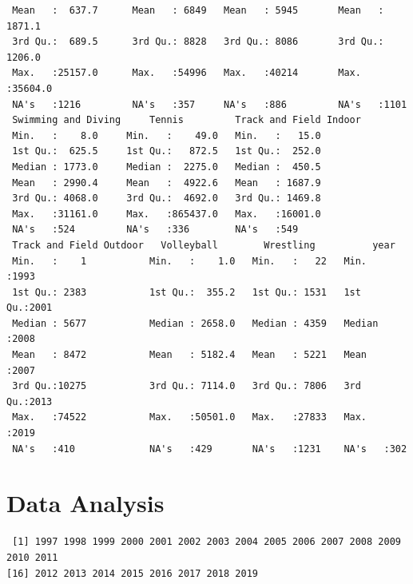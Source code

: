 \documentclass[
  letterpaper,
  DIV=11,
  numbers=noendperiod]{scrartcl}
\newenvironment{Shaded}{\begin{snugshade}}{\end{snugshade}}
\newcommand{\FunctionTok}[1]{\textcolor[rgb]{0.28,0.35,0.67}{#1}}
\newcommand{\NormalTok}[1]{\textcolor[rgb]{0.00,0.23,0.31}{#1}}
\newcommand{\SpecialCharTok}[1]{\textcolor[rgb]{0.37,0.37,0.37}{#1}}
\begin{document}
\begin{verbatim}
 Mean   :  637.7      Mean   : 6849   Mean   : 5945       Mean   : 1871.1    
 3rd Qu.:  689.5      3rd Qu.: 8828   3rd Qu.: 8086       3rd Qu.: 1206.0    
 Max.   :25157.0      Max.   :54996   Max.   :40214       Max.   :35604.0    
 NA's   :1216         NA's   :357     NA's   :886         NA's   :1101       
 Swimming and Diving     Tennis         Track and Field Indoor
 Min.   :    8.0     Min.   :    49.0   Min.   :   15.0       
 1st Qu.:  625.5     1st Qu.:   872.5   1st Qu.:  252.0       
 Median : 1773.0     Median :  2275.0   Median :  450.5       
 Mean   : 2990.4     Mean   :  4922.6   Mean   : 1687.9       
 3rd Qu.: 4068.0     3rd Qu.:  4692.0   3rd Qu.: 1469.8       
 Max.   :31161.0     Max.   :865437.0   Max.   :16001.0       
 NA's   :524         NA's   :336        NA's   :549           
 Track and Field Outdoor   Volleyball        Wrestling          year     
 Min.   :    1           Min.   :    1.0   Min.   :   22   Min.   :1993  
 1st Qu.: 2383           1st Qu.:  355.2   1st Qu.: 1531   1st Qu.:2001  
 Median : 5677           Median : 2658.0   Median : 4359   Median :2008  
 Mean   : 8472           Mean   : 5182.4   Mean   : 5221   Mean   :2007  
 3rd Qu.:10275           3rd Qu.: 7114.0   3rd Qu.: 7806   3rd Qu.:2013  
 Max.   :74522           Max.   :50501.0   Max.   :27833   Max.   :2019  
 NA's   :410             NA's   :429       NA's   :1231    NA's   :302   
\end{verbatim}

\section{Data Analysis}\label{data-analysis}

\begin{Shaded}
\end{Shaded}

\begin{verbatim}
 [1] 1997 1998 1999 2000 2001 2002 2003 2004 2005 2006 2007 2008 2009 2010 2011
[16] 2012 2013 2014 2015 2016 2017 2018 2019
\end{verbatim}
\end{document}
